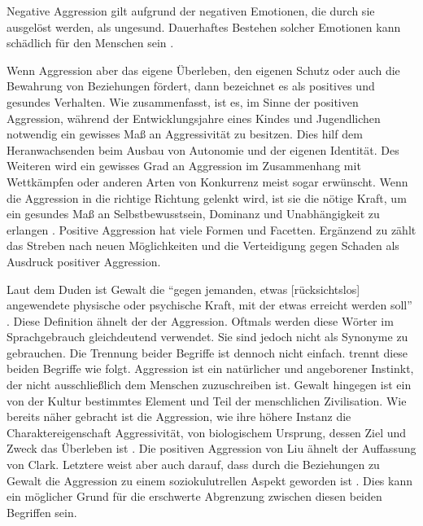 Negative Aggression gilt aufgrund der negativen Emotionen, die durch sie ausgelöst werden, als ungesund. Dauerhaftes Bestehen solcher Emotionen kann  schädlich für den Menschen sein \parencite{Aggression}.

Wenn Aggression aber das eigene Überleben, den eigenen Schutz oder auch die Bewahrung von Beziehungen fördert, dann bezeichnet \textcite{positive_aggression} 
es als positives und gesundes Verhalten. Wie \textcite{Aggression} zusammenfasst, ist es, im Sinne der positiven Aggression, während der Entwicklungsjahre eines 
Kindes und Jugendlichen notwendig ein gewisses Maß an Aggressivität zu besitzen. Dies hilf dem Heranwachsenden beim Ausbau von Autonomie und der eigenen Identität. Des Weiteren wird ein gewisses Grad an Aggression im Zusammenhang mit Wettkämpfen oder anderen Arten von Konkurrenz meist sogar erwünscht. Wenn die Aggression in die richtige Richtung gelenkt wird, ist sie die nötige Kraft, um ein gesundes Maß an Selbstbewusstsein, Dominanz und Unabhängigkeit zu erlangen \parencite{Aggression}. Positive Aggression hat viele Formen und Facetten. Ergänzend zu \textcite{positive_aggression} zählt \textcite{jack1999behind}
das Streben nach neuen Möglichkeiten und die Verteidigung gegen Schaden als Ausdruck positiver Aggression.

Laut dem Duden ist Gewalt die \enquote{gegen jemanden, etwas [rücksichtslos] angewendete physische oder psychische Kraft, mit der etwas erreicht werden soll} \parencite{Gewalt_Duden}. Diese Definition ähnelt der der Aggression. Oftmals werden diese Wörter im Sprachgebrauch gleichdeutend verwendet. Sie sind jedoch nicht als Synonyme zu gebrauchen. Die Trennung beider Begriffe ist dennoch nicht einfach. \textcite{Def_Aggressivität_vs_violence} trennt diese beiden Begriffe wie folgt. Aggression ist ein natürlicher und angeborener Instinkt, der nicht ausschließlich dem Menschen zuzuschreiben ist. Gewalt hingegen ist ein von der Kultur bestimmtes Element und Teil der menschlichen Zivilisation. Wie bereits näher gebracht ist die Aggression, wie ihre höhere Instanz die Charaktereigenschaft Aggressivität, von biologischem Ursprung, dessen Ziel und Zweck das Überleben ist \parencite{Def_Aggressivität_vs_violence, Aggression}.
Die positiven Aggression von Liu ähnelt der Auffassung von Clark. Letztere weist aber auch darauf, dass durch die Beziehungen zu Gewalt die Aggression zu einem soziokulutrellen Aspekt geworden ist \parencite{Def_Aggressivität_vs_violence}.
Dies kann ein möglicher Grund für die erschwerte Abgrenzung zwischen diesen beiden
Begriffen sein. 

